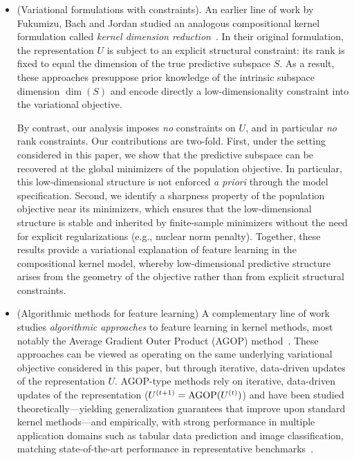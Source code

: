 \documentclass[sn-mathphys-num]{sn-jnl}%
\numberwithin{equation}{section}
\theoremstyle{thmstyleone}%
\theoremstyle{thmstyletwo}%
\theoremstyle{thmstylethree}%
\begin{document}
\vspace{.5em} 
\begin{itemize}
\item (Variational formulations with constraints). An earlier line of work by Fukumizu, Bach and Jordan studied an analogous compositional kernel formulation called \emph{kernel dimension reduction}~\cite{FukumizuBaJo04, FukumizuBaJo09}. In their original formulation, the representation $U$ is subject to an explicit structural constraint: its rank is fixed to equal the dimension of the true predictive subspace $S$. As a result, these approaches presuppose prior knowledge of the intrinsic subspace dimension $\dim(S)$ and encode directly a low-dimensionality constraint into the variational objective.

By contrast, our analysis imposes \emph{no} constraints on $U$, and in particular \emph{no} rank constraints. Our contributions are two-fold. First, under the setting considered in this paper, we show that the predictive subspace can be recovered at the global minimizers of the population objective. In particular, this low-dimensional structure is not enforced \emph{a priori} through the model specification. Second, we identify a sharpness property of the population objective near its minimizers, which ensures that the low-dimensional structure is stable and inherited by finite-sample minimizers without the need for explicit regularizations (e.g., nuclear norm penalty). Together, these results provide a variational explanation of feature learning in the compositional kernel model, whereby low-dimensional predictive structure arises from the geometry of the objective rather than from explicit structural constraints. 

\item (Algorithmic methods for feature learning)
A complementary line of work studies \emph{algorithmic approaches} to feature learning in kernel methods, most notably the Average Gradient Outer Product (AGOP) method~\cite{Adit24A}. These approaches can be viewed as operating on the same underlying variational objective considered in this paper, but through iterative, data-driven updates of the representation $U$. AGOP-type methods rely on iterative, data-driven updates of the representation ($U^{(t+1)} = {\rm AGOP}(U^{(t)})$) and have been studied theoretically—yielding generalization guarantees that improve upon standard kernel methods—and empirically, with strong performance in multiple application domains such as tabular data prediction and image classification, matching state-of-the-art performance in representative benchmarks~\cite{Adit24A, ZhuDaDrFa25, Beagleholeetal25}. 


\end{itemize}
\end{document}
